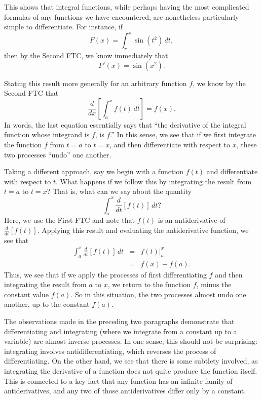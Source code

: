 This shows that integral functions, while perhaps having the most complicated formulas of any functions we have encountered, are nonetheless particularly simple to differentiate.  For instance, if 
$$F(x) = \int_{\pi}^x \sin(t^2) \, dt,$$
then by the Second FTC, we know immediately that
$$F'(x) = \sin(x^2).$$

Stating this result more generally for an arbitrary function $f$, we know by the Second FTC that
$$\frac{d}{dx} \left[ \int_a^x f(t) \, dt \right] = f(x).$$
In words, the last equation essentially says that ``the derivative of the integral function whose integrand is $f$, is $f$.''  In this sense, we see that if we first integrate the function $f$ from $t = a$ to $t = x$, and then differentiate with respect to $x$, these two processes ``undo'' one another.

Taking a different approach, say we begin with a function $f(t)$ and differentiate with respect to $t$.  What happens if we follow this by integrating the result from $t = a$ to $t = x$?  That is, what can we say about the quantity
$$\int_a^x \frac{d}{dt} \left[ f(t) \right] \, dt?$$
Here, we use the First FTC and note that $f(t)$ is an antiderivative of $\frac{d}{dt} \left[ f(t) \right].$  Applying this result and evaluating the antiderivative function, we see that
\begin{eqnarray*}
\int_a^x \frac{d}{dt} \left[ f(t) \right] \, dt & = & f(t) \bigg\vert_a^x \\
							& = & f(x) - f(a).
\end{eqnarray*} 
Thus, we see that if we apply the processes of first differentiating $f$ and then integrating the result from $a$ to $x$, we return to the function $f$, minus the constant value $f(a)$.  So in this situation, the two processes almost undo one another, up to the constant $f(a)$.

The observations made in the preceding two paragraphs demonstrate that differentiating and integrating (where we integrate from a constant up to a variable) are almost inverse processes.  In one sense, this should not be surprising:  integrating involves antidifferentiating, which reverses the process of differentiating.  On the other hand, we see that there is some subtlety involved, as integrating the derivative of a function does not quite produce the function itself.  This is connected to a key fact  that any function has an infinite family of antiderivatives, and any two of those antiderivatives differ only by a constant.



